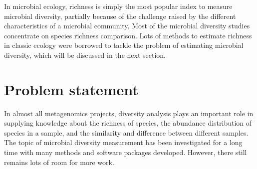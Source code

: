 In microbial ecology, richness is simply the most popular index to measure
microbial diversity, partially because of the challenge raised by the different
characteristics of a microbial community. Most of the microbial diversity studies
concentrate on species richness comparison\cite{Bohannan2003}. 
Lots of methods to estimate richness in
classic ecology were borrowed to tackle the problem of estimating microbial
diversity, which will be discussed in the next section.
\section{Problem statement}


In almost all  metagenomics projects, diversity analysis plays an important
role in supplying knowledge about the richness of species, the 
abundance distribution of species in a sample, and the similarity and difference between
different samples. The topic of microbial diversity measurement has been
investigated for a long time with many methods and software packages developed.
However, there still remains lots of room for more work.


